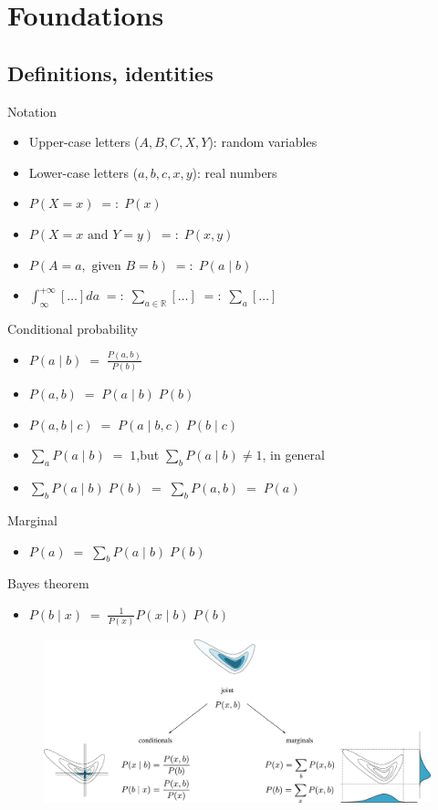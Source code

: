 \section{Foundations}

\subsection{Definitions, identities}
\no Notation
\begin{itemize}
	\item Upper-case letters ($A, B, C, X, Y$): random variables
	\item Lower-case letters ($a, b, c, x, y$): real numbers
	\item $P(X = x) \;=:\; P(x)$
	\item $P(X = x \text{ and } Y = y) \;=:\; P(x, y)$
	\item $P(A = a, \text{ given } B = b) \;=:\; P(a\;|\;b)$
	\item $\int_{\infty}^{+\infty}[\ldots] da \;=:\; \sum_{a\in \mathds{R}} [\ldots] \;=:\; \sum_a[\ldots] $
\end{itemize}
Conditional probability
\begin{itemize}
	\item $P(a\;|\;b) \;=\; \frac{P(a,b)}{P(b)}$
	\item $P(a, b) \;=\; P(a\;|\; b) \;P(b)$
	\item $P(a, b\;|\;c) \;=\;  P(a\;|\;b,c) \; P(b\;|\;c)$
	\item $\sum_a P(a\;|\;b) \;=\; 1$,\quad but \;$\sum_b P(a\;|\;b) \neq 1$, in general
	\item $\sum_b P(a\;|\;b) \; P(b) \;=\; \sum_b P(a,b) \;=\; P(a)$
\end{itemize}
Marginal
\begin{itemize}
	\item $P(a) \;=\; \sum_b P(a\;|\;b) \; P(b)$
\end{itemize}
Bayes theorem
\begin{itemize}
	\item $P(b\;|\;x) \;=\; \frac{1}{P(x)} P(x\;|\;b) \; P(b)$
\vspace{0.5cm}
\end{itemize}
\begin{figure}[h]
	\centering
	\includegraphics[width=\textwidth]{./figs/Joint-Conditional-Marginal.pdf}
\end{figure}

